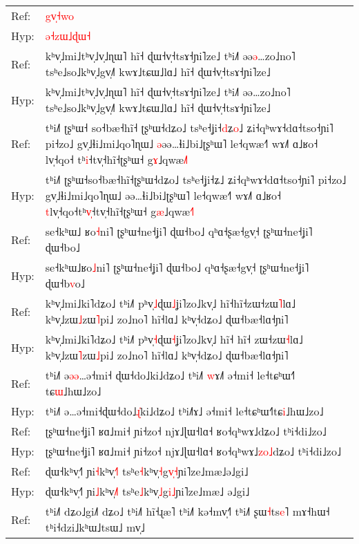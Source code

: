 \documentclass[10pt]{article}
\DeclareRobustCommand{\hl}[1]{{\textcolor{red}{#1}}}
\begin{document}
\begin{longtable}{ll}
\midrule 
Ref: & \hl{g}\hl{v}\hl{̩}\hl{˧}\hl{w}\hl{o} \\ 
Hyp: & \hl{ə}\hl{˧}\hl{z}\hl{ɯ}\hl{˩}\hl{ɖ}\hl{ɯ}\hl{˧} \\ 
\midrule 
Ref: & kʰv̩˩mi˩tʰv̩˩v̩˩ɳɯ˥ hĩ˧ ɖɯ˧v̩˧tsɤ˧ɲi˥ze˩ tʰi˩˥ əə\hl{ə}…zo˩no˥ tsʰe˩so˩kʰv̩˩gv̩˩˥ kwɤ˩tɕɯ˩lɑ˩ hĩ˧ ɖɯ˧v̩˧tsɤ˧ɲi˥ze˩ \\ 
Hyp: & kʰv̩˩mi˩tʰv̩˩v̩˩ɳɯ˥ hĩ˧ ɖɯ˧v̩˧tsɤ˧ɲi˥ze˩ tʰi˩˥ əə…zo˩no˥ tsʰe˩so˩kʰv̩˩gv̩˩˥ kwɤ˩tɕɯ˩lɑ˩ hĩ˧ ɖɯ˧v̩˧tsɤ˧ɲi˥ze˩ \\ 
\midrule 
Ref: & tʰi˩˥ ʈʂʰɯ˧\hl{ }so˧bæ˧hĩ˧\hl{ }ʈʂʰɯ˧dʑo˩ tsʰe˧ʝi˧\hl{d}ʑ\hl{o}˩ ʑi˧qʰwɤ˧dɑ˧tso˧ɲi˥ pi˧zo˩ gv̩˩ɬi˩mi˩qo˥ɳɯ˩ \hl{ə}əə…ɬi˩bi˩ʈʂʰɯ˥ le˧qwæ˧˥ wɤ˩˥ ɑ˩ʁo˧ lv̩˧qo˧\hl{ }tʰ\hl{i}˧tv̩˧hĩ˧ʈʂʰɯ˧ g\hl{ɤ}˩qwæ\hl{˩}˥ \\ 
Hyp: & tʰi˩˥ ʈʂʰɯ˧so˧bæ˧hĩ˧ʈʂʰɯ˧dʑo˩ tsʰe˧ʝi˧ʑ˩ ʑi˧qʰwɤ˧dɑ˧tso˧ɲi˥ pi˧zo˩ gv̩˩ɬi˩mi˩qo˥ɳɯ˩ əə…ɬi˩bi˩ʈʂʰɯ˥ le˧qwæ˧˥ wɤ˩˥ ɑ˩ʁo˧ \hl{t}lv̩˧qo˧tʰ\hl{v}\hl{̩}˧tv̩˧hĩ˧ʈʂʰɯ˧ g\hl{æ}˩qwæ\hl{˧}˥ \\ 
\midrule 
Ref: & se˧kʰɯ˩\hl{ }ʁo\hl{˧}ni˥ ʈʂʰɯ˧ne˧ʝi˥ ɖɯ˧bo˩ qʰɑ˧ʂæ˧gv̩˧ ʈʂʰɯ˧ne˧ʝi˥ ɖɯ˧bo˩ \\ 
Hyp: & se˧kʰɯ˩ʁo\hl{˩}ni˥ ʈʂʰɯ˧ne˧ʝi˥ ɖɯ˧bo˩ qʰɑ˧ʂæ˧gv̩˧ ʈʂʰɯ˧ne˧ʝi˥ ɖɯ˧b\hl{v}o˩ \\ 
\midrule 
Ref: & kʰv̩˩mi˩ki˥dʑo˩ tʰi˩˥ pʰv̩\hl{˩}ɖɯ\hl{˩}ʝi˥zo˩kv̩˩ hĩ˧hĩ˧zɯ˧zɯ\hl{˥}lɑ˩ kʰv̩˩zɯ\hl{˩}zɯ\hl{˥}pi˩ zo˩no˥ hĩ˧lɑ˩ kʰv̩˧dʑo˩ ɖɯ˧bæ˧lɑ˧ɲi˥ \\ 
Hyp: & kʰv̩˩mi˩ki˥dʑo˩ tʰi˩˥ pʰv̩\hl{˧}ɖɯ\hl{˧}ʝi˥zo˩kv̩˩ hĩ˧\hl{ }hĩ˧\hl{ }zɯ˧zɯ\hl{˧}lɑ˩ kʰv̩˩zɯ\hl{˥}zɯ\hl{˩}pi˩ zo˩no˥ hĩ˧lɑ˩ kʰv̩˧dʑo˩ ɖɯ˧bæ˧lɑ˧ɲi˥ \\ 
\midrule 
Ref: & tʰi˩˥ ə\hl{ə}\hl{ə}…ə˧mi˧\hl{ }ɖɯ˧do˩ki˩dʑo˩ tʰi˩˥\hl{ }\hl{w}ɤ˩\hl{˥} ə˧mi˧ le˧tɕʰɯ˧˥\hl{ }tɕ\hl{ɯ}˩hɯ˩zo˩ \\ 
Hyp: & tʰi˩˥ ə…ə˧mi˧ɖɯ˧do˩\hl{ɻ}\hl{̍}ki˩dʑo˩ tʰi˩˥ɤ˩ ə˧mi˧ le˧tɕʰɯ˧˥tɕ\hl{i}˩hɯ˩zo˩ \\ 
\midrule 
Ref: & ʈʂʰɯ˧ne˧ʝi˥ ʁɑ˩mi˧ ɲi˧zo˧ njɤ˩ɭɯ˧lɑ˧ ʁo˧qʰwɤ˩dʑo˩ tʰi˧di˩zo˩ \\ 
Hyp: & ʈʂʰɯ˧ne˧ʝi˥ ʁɑ˩mi˧ ɲi˧zo˧ njɤ˩ɭɯ˧lɑ˧ ʁo˧qʰwɤ˩\hl{z}\hl{o}\hl{˩}dʑo˩ tʰi˧di˩zo˩ \\ 
\midrule 
Ref: & ɖɯ˧kʰv̩˧˥ ɲi\hl{˧}kʰv̩\hl{˧}˥ tsʰe\hl{˧}kʰv̩\hl{˧}g\hl{v}\hl{̩}\hl{˧}ɲi˥ze˩mæ˩ə˩gi˩ \\ 
Hyp: & ɖɯ˧kʰv̩˧˥ ɲi\hl{˩}kʰv̩\hl{˩}˥ tsʰe\hl{˩}kʰv̩\hl{˩}g\hl{i}\hl{˩}ɲi˥ze˩mæ˩\hl{ }ə˩gi˩ \\ 
\midrule 
Ref: & tʰi˩˥ dʑo˩gi˩˥ dʑo˩ tʰi˩˥ hĩ˧ɻæ˥ tʰi˩˥ kə˧mv̩˧˥ tʰi˩˥ ʂɯ\hl{˧}ts\hl{e}˥ mɤ˧hɯ˧ tʰi˧dzi˩kʰɯ˩tsɯ˩ mv̩˩ \\ 

\end{longtable}
\end{document}

